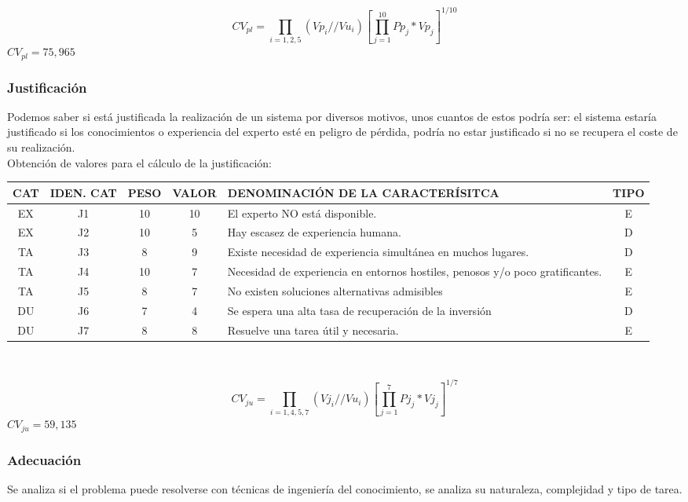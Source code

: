 \documentclass[letterpaper,12pt]{article}
\begin{document}
\begin{center}
	\[
	CV_{pl} = \prod_{i=1,2,5}(Vp_{i}//Vu_{i})[\prod_{j=1}^{10}Pp_{j}*Vp_{j}]^{1/10}
	\]
	$CV_{pl} = 75,965$
\end{center}

\newpage
\subsubsection{Justificación}
Podemos saber si está justificada la realización de un sistema por diversos
motivos, unos cuantos de estos podría ser: el sistema estaría justificado si los conocimientos o experiencia del experto esté en peligro de pérdida, podría no estar justificado si no se recupera el coste de su realización. \\

Obtención de valores para el cálculo de la justificación:


\begin{tabular}{|c|c|c|c|p{7.3 cm}|c|}
	\hline 
	CAT & IDEN. CAT & PESO & VALOR & DENOMINACIÓN DE LA CARACTERÍSITCA & TIPO \\ 
	\hline 
	EX & J1 & 10 & 10 & El experto NO está disponible. & E \\ 
	\hline 
	EX & J2 & 10 & 5 & Hay escasez de experiencia humana. & D \\ 
	\hline 
	TA & J3 & 8 & 9 & Existe necesidad de experiencia simultánea en muchos lugares. & D \\ 
	\hline 
	TA & J4 & 10 & 7 & Necesidad de experiencia en entornos hostiles, penosos y/o poco gratificantes. & E \\ 
	\hline 
	TA & J5 & 8 & 7 & No existen soluciones alternativas admisibles & E \\ 
	\hline 
	DU & J6 & 7 & 4 & Se espera una alta tasa de recuperación de la inversión & D \\ 
	\hline 
	DU & J7 & 8 & 8 & Resuelve una tarea útil y necesaria. & E \\ 
	\hline 
\end{tabular} \\

\begin{center}
	\[
	CV_{ju} = \prod_{i=1,4,5,7}(Vj_{i}//Vu_{i})[\prod_{j=1}^{7}Pj_{j}*Vj_{j}]^{1/7}
	\]
	$CV_{ju} = 59,135$
\end{center}

\newpage
\subsubsection{Adecuación}
Se analiza si el problema puede resolverse con técnicas de ingeniería del conocimiento, se analiza su naturaleza, complejidad y tipo de tarea.\\
\end{document}
